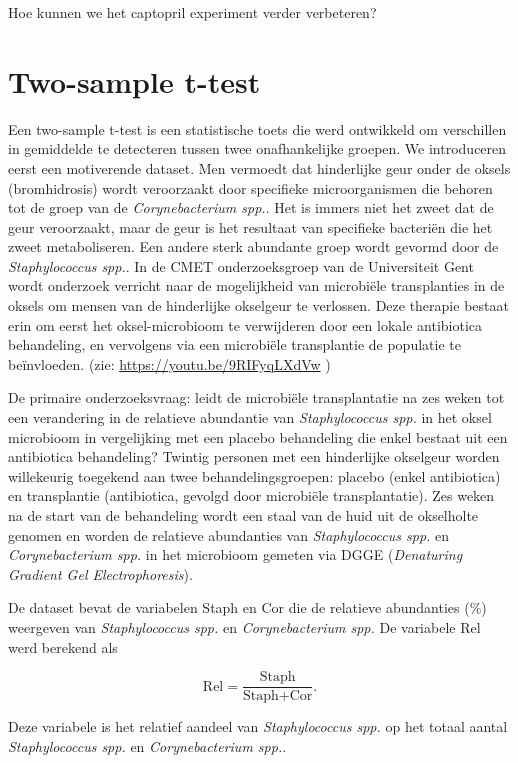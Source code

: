 \documentclass[
  12pt,dutch,coursenotes]{book}
\theoremstyle{definition}
\theoremstyle{definition}
\theoremstyle{definition}
\theoremstyle{remark}
\begin{document}
Hoe kunnen we het captopril experiment verder verbeteren?

\hypertarget{two-sample-t-test}{%
\section{Two-sample t-test}\label{two-sample-t-test}}

Een two-sample t-test is een statistische toets die werd ontwikkeld om verschillen in gemiddelde te detecteren tussen twee onafhankelijke groepen. We introduceren eerst een motiverende dataset.
Men vermoedt dat hinderlijke geur onder de oksels (bromhidrosis) wordt veroorzaakt door specifieke microorganismen die behoren tot de groep van de \emph{Corynebacterium spp.}. Het is immers niet het zweet dat de geur veroorzaakt, maar de geur is het resultaat van specifieke bacteriën die het zweet metaboliseren. Een andere sterk abundante groep wordt gevormd door de \emph{Staphylococcus spp.}. In de CMET onderzoeksgroep van de Universiteit Gent wordt onderzoek verricht naar de mogelijkheid van microbiële transplanties in de oksels om mensen van de hinderlijke okselgeur te verlossen. Deze therapie bestaat erin om eerst het oksel-microbioom te verwijderen door een lokale antibiotica behandeling, en vervolgens via een microbiële transplantie de populatie te beïnvloeden. (zie: \url{https://youtu.be/9RIFyqLXdVw} )

De primaire onderzoeksvraag: leidt de microbiële transplantatie na zes weken tot een verandering in de relatieve abundantie van \emph{Staphylococcus spp.} in het oksel microbioom in vergelijking met een placebo behandeling die enkel bestaat uit een antibiotica behandeling?
Twintig personen met een hinderlijke okselgeur worden willekeurig toegekend aan twee behandelingsgroepen: placebo (enkel antibiotica) en transplantie (antibiotica, gevolgd door microbiële transplantatie).
Zes weken na de start van de behandeling wordt een staal van de huid uit de okselholte genomen en worden de relatieve abundanties van \emph{Staphylococcus spp.} en \emph{Corynebacterium spp.} in het microbioom gemeten via DGGE (\emph{Denaturing Gradient Gel Electrophoresis}).

De dataset bevat de variabelen Staph en Cor die de relatieve abundanties (\%) weergeven van \emph{Staphylococcus spp.} en \emph{Corynebacterium spp.} De variabele Rel werd berekend als

\[
    \text{Rel}=\frac{\text{Staph}}{\text{Staph}+\text{Cor}}.
  \]

Deze variabele is het relatief aandeel van \emph{Staphylococcus spp.} op het totaal aantal \emph{Staphylococcus spp.} en \emph{Corynebacterium spp.}.
\end{document}
